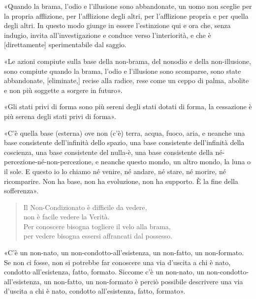 
%
«Quando la brama, l’odio e l’illusione sono abbandonate, un uomo non sceglie per
la propria afflizione, per l’afflizione degli altri, per l’afflizione propria e
per quella degli altri. In questo modo giunge in essere l’estinzione qui e ora
che, senza indugio, invita all’investigazione e conduce verso l’interiorità, e
che è [direttamente] sperimentabile dal saggio.


«Le azioni compiute sulla base della non-brama, del nonodio e della
non-illusione, sono compiute quando la brama, l’odio e l’illusione sono
scomparse, sono state abbandonate, [eliminate,] recise alla radice, rese come un
ceppo di palma, abolite e non più soggette a sorgere in futuro».


«Gli stati privi di forma sono più sereni degli stati dotati di forma, la
cessazione è più serena degli stati privi di forma».


«C’è quella base (esterna) ove non (c’è) terra, acqua, fuoco, aria, e neanche
una base consistente dell’infinità dello spazio, una base consistente
dell’infinità della coscienza, una base consistente del nulla-è, una base
consistente della né-percezione-né-non-percezione, e neanche questo mondo, un
altro mondo, la luna o il sole. E questo io lo chiamo né venire, né andare, né
stare, né morire, né ricomparire. Non ha base, non ha evoluzione, non ha
supporto. È la fine della sofferenza».

\begin{quote}
Il Non-Condizionato è difficile da vedere, \\
non è facile vedere la Verità. \\
Per conoscere bisogna togliere il velo alla brama, \\
per vedere bisogna essersi affrancati dal possesso.
\end{quote}

«C’è un non-nato, un non-condotto-all’esistenza, un non-fatto, un non-formato.
Se non ci fosse, non si potrebbe far conoscere una via d’uscita a chi è nato,
condotto all’esistenza, fatto, formato. Siccome c’è un non-nato, un
non-condotto-all’esistenza, un non-fatto, un non-formato è perciò possibile
descrivere una via d’uscita a chi è nato, condotto all’esistenza, fatto,
formato».

